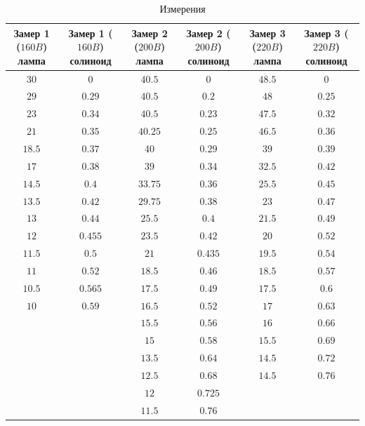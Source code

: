 \begin{table}[!h]
    \centering
    \begin{tabular}{|c|c|c|c|c|c|}
         \hline
         \makecell{Замер 1\\($160B$)\\лампа} &
         \makecell{Замер 1\\($160B$)\\солиноид}&
         \makecell{Замер 2\\($200B$)\\лампа} &
         \makecell{Замер 2\\($200B$)\\солиноид}&
         \makecell{Замер 3\\($220B$)\\лампа} &
         \makecell{Замер 3\\($220B$)\\солиноид}\\
         \hline
         $30$& $0$& $40.5$& $0$& $48.5$& $0$\\
         \hline
         $29$& $0.29$& $40.5$& $0.2$& $48$& $0.25$\\
         \hline
         $23$& $0.34$& $40.5$& $0.23$& $47.5$& $0.32$\\
         \hline
         $21$& $0.35$& $40.25$& $0.25$& $46.5$& $0.36$\\
         \hline
         $18.5$& $0.37$& $40$& $0.29$& $39$& $0.39$\\
         \hline
         $17$& $0.38$& $39$& $0.34$& $32.5$& $0.42$\\
         \hline
         $14.5$& $0.4$& $33.75$& $0.36$& $25.5$& $0.45$\\
         \hline
         $13.5$& $0.42$& $29.75$& $0.38$& $23$& $0.47$\\
         \hline
         $13$& $0.44$& $25.5$& $0.4$& $21.5$& $0.49$\\
         \hline
         $12$& $0.455$& $23.5$& $0.42$& $20$& $0.52$\\
         \hline
         $11.5$& $0.5$& $21$& $0.435$& $19.5$& $0.54$\\
         \hline
         $11$& $0.52$& $18.5$& $0.46$& $18.5$& $0.57$\\
         \hline
         $10.5$& $0.565$& $17.5$& $0.49$& $17.5$& $0.6$\\
         \hline
         $10$& $0.59$& $16.5$& $0.52$& $17$& $0.63$\\
         \hline
         & & $15.5$& $0.56$& $16$& $0.66$\\
         \hline
         & & $15$& $0.58$& $15.5$& $0.69$\\
         \hline
         & & $13.5$& $0.64$& $14.5$& $0.72$\\
         \hline
         & & $12.5$& $0.68$& $14.5$& $0.76$\\
         \hline
         & & $12$& $0.725$& & \\
         \hline
         & & $11.5$& $0.76$& & \\
         \hline
         
    \end{tabular}
    \caption{Измерения}
    \label{tab:my_label1}
\end{table}
